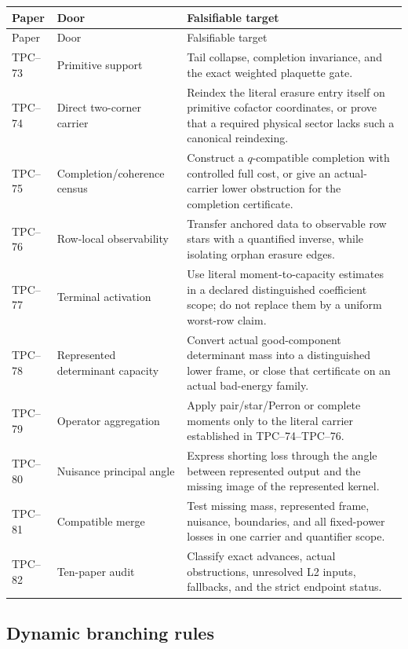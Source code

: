\begin{longtable}{@{}
 >{\raggedright\arraybackslash}p{}
 >{\raggedright\arraybackslash}p{}
 >{\raggedright\arraybackslash}p{}@{}}
\toprule
Paper & Door & Falsifiable target\\
\midrule
\endfirsthead
\toprule
Paper & Door & Falsifiable target\\
\midrule
\endhead
TPC--73 &
Primitive support &
Tail collapse, completion invariance, and the exact weighted plaquette
gate.\\
TPC--74 &
Direct two-corner carrier &
Reindex the literal erasure entry itself on primitive cofactor coordinates,
or prove that a required physical sector lacks such a canonical
reindexing.\\
TPC--75 &
Completion/coherence census &
Construct a \(q\)-compatible completion with controlled full cost, or give
an actual-carrier lower obstruction for the completion certificate.\\
TPC--76 &
Row-local observability &
Transfer anchored data to observable row stars with a quantified inverse,
while isolating orphan erasure edges.\\
TPC--77 &
Terminal activation &
Use literal moment-to-capacity estimates in a declared distinguished
coefficient scope; do not replace them by a uniform worst-row claim.\\
TPC--78 &
Represented determinant capacity &
Convert actual good-component determinant mass into a distinguished lower
frame, or close that certificate on an actual bad-energy family.\\
TPC--79 &
Operator aggregation &
Apply pair/star/Perron or complete moments only to the literal carrier
established in TPC--74--TPC--76.\\
TPC--80 &
Nuisance principal angle &
Express shorting loss through the angle between represented output and the
missing image of the represented kernel.\\
TPC--81 &
Compatible merge &
Test missing mass, represented frame, nuisance, boundaries, and all
fixed-power losses in one carrier and quantifier scope.\\
TPC--82 &
Ten-paper audit &
Classify exact advances, actual obstructions, unresolved L2 inputs,
fallbacks, and the strict endpoint status.\\
\bottomrule
\end{longtable}

\subsection{Dynamic branching rules}

